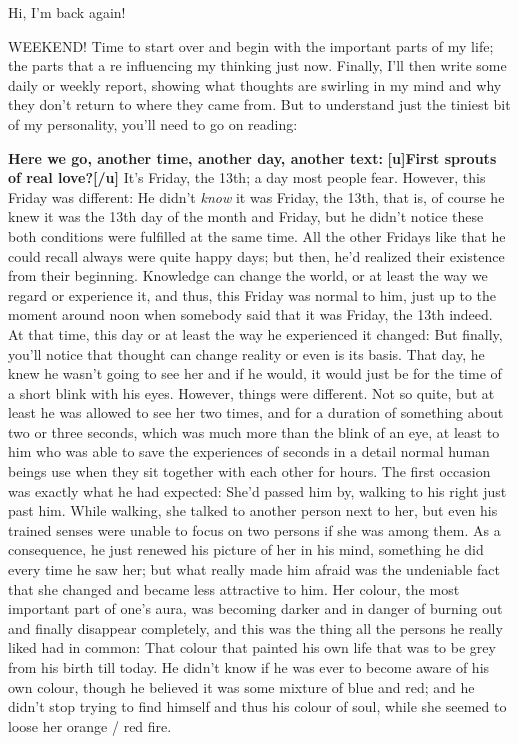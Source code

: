 Hi, I'm back again!

WEEKEND! Time to start over and begin with the important parts of my life; the parts that a re influencing my thinking just now. Finally, I'll then write some daily or weekly report, showing what thoughts are swirling in my mind and why they don't return to where they came from. But to understand just the tiniest bit of my personality, you'll need to go on reading:

\textbf{Here we go, another time, another day, another text:}
\textbf{[u]First sprouts of real love?[/u]}
It's Friday, the 13th; a day most people fear. However, this Friday was different: He didn't \emph{know} it was Friday, the 13th, that is, of course he knew it was the 13th day of the month and Friday, but he didn't notice these both conditions were fulfilled at the same time. All the other Fridays like that he could recall always were quite happy days; but then, he'd realized their existence from their beginning. Knowledge can change the world, or at least the way we regard or experience it, and thus, this Friday was normal to him, just up to the moment around noon when somebody said that it was Friday, the 13th indeed. At that time, this day or at least the way he experienced it changed: But finally, you'll notice that thought can change reality or even is its basis. 
That day, he knew he wasn't going to see her and if he would, it would just be for the time of a short blink with his eyes. However, things were different. Not so quite, but at least he was allowed to see her two times, and for a duration of something about two or three seconds, which was much more than the blink of an eye, at least to him who was able to save the experiences of seconds in a detail normal human beings use when they sit together with each other for hours. 
The first occasion was exactly what he had expected: She'd passed him by, walking to his right just past him. While walking, she talked to another person next to her, but even his trained senses were unable to focus on two persons if she was among them. As a consequence, he just renewed his picture of her in his mind, something he did every time he saw her; but what really made him afraid was the undeniable fact that she changed and became less attractive to him. Her colour, the most important part of one's aura, was becoming darker and in danger of burning out and finally disappear completely, and this was the thing all the persons he really liked had in common: That colour that painted his own life that was to be grey from his birth till today. He didn't know if he was ever to become aware of his own colour, though he believed it was some mixture of blue and red; and he didn't stop trying to find himself and thus his colour of soul, while she seemed to loose her orange / red fire. 
